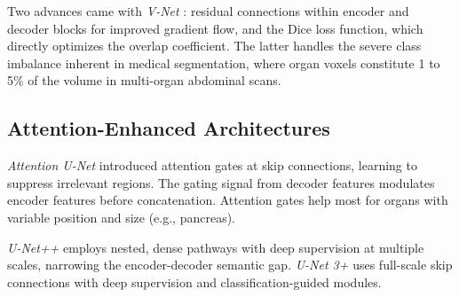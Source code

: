 \documentclass[conference]{IEEEtran}
\begin{document}
Two advances came with \emph{V-Net} \cite{milletari2016vnet}: residual connections within encoder and decoder blocks for improved gradient flow, and the Dice loss function, which directly optimizes the overlap coefficient. The latter handles the severe class imbalance inherent in medical segmentation, where organ voxels constitute 1 to 5\% of the volume in multi-organ abdominal scans.

\subsection{Attention-Enhanced Architectures}

\emph{Attention U-Net} \cite{oktay2018attention} introduced attention gates at skip connections, learning to suppress irrelevant regions. The gating signal from decoder features modulates encoder features before concatenation. Attention gates help most for organs with variable position and size (e.g., pancreas).

\emph{U-Net++} \cite{zhou2018unetpp} employs nested, dense pathways with deep supervision at multiple scales, narrowing the encoder-decoder semantic gap. \emph{U-Net 3+} \cite{huang2020unet3plus} uses full-scale skip connections with deep supervision and classification-guided modules.
\end{document}
